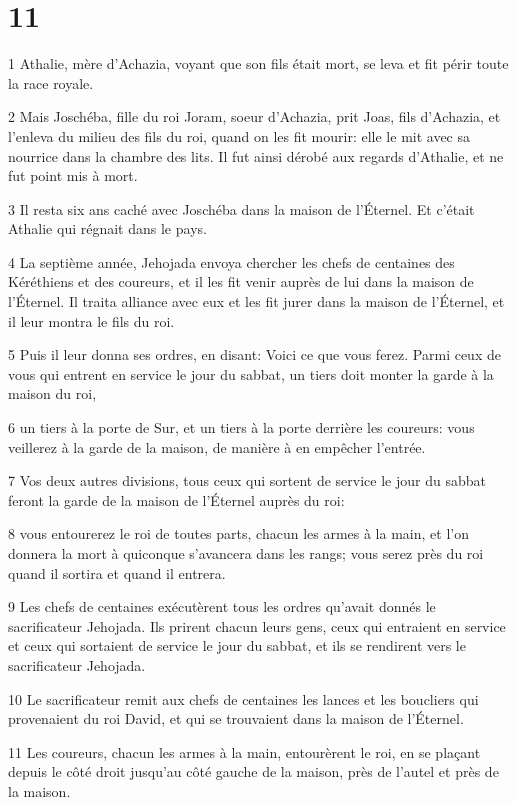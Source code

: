\chapter{11}

\par 1 Athalie, mère d'Achazia, voyant que son fils était mort, se leva et fit périr toute la race royale.
\par 2 Mais Joschéba, fille du roi Joram, soeur d'Achazia, prit Joas, fils d'Achazia, et l'enleva du milieu des fils du roi, quand on les fit mourir: elle le mit avec sa nourrice dans la chambre des lits. Il fut ainsi dérobé aux regards d'Athalie, et ne fut point mis à mort.
\par 3 Il resta six ans caché avec Joschéba dans la maison de l'Éternel. Et c'était Athalie qui régnait dans le pays.
\par 4 La septième année, Jehojada envoya chercher les chefs de centaines des Kéréthiens et des coureurs, et il les fit venir auprès de lui dans la maison de l'Éternel. Il traita alliance avec eux et les fit jurer dans la maison de l'Éternel, et il leur montra le fils du roi.
\par 5 Puis il leur donna ses ordres, en disant: Voici ce que vous ferez. Parmi ceux de vous qui entrent en service le jour du sabbat, un tiers doit monter la garde à la maison du roi,
\par 6 un tiers à la porte de Sur, et un tiers à la porte derrière les coureurs: vous veillerez à la garde de la maison, de manière à en empêcher l'entrée.
\par 7 Vos deux autres divisions, tous ceux qui sortent de service le jour du sabbat feront la garde de la maison de l'Éternel auprès du roi:
\par 8 vous entourerez le roi de toutes parts, chacun les armes à la main, et l'on donnera la mort à quiconque s'avancera dans les rangs; vous serez près du roi quand il sortira et quand il entrera.
\par 9 Les chefs de centaines exécutèrent tous les ordres qu'avait donnés le sacrificateur Jehojada. Ils prirent chacun leurs gens, ceux qui entraient en service et ceux qui sortaient de service le jour du sabbat, et ils se rendirent vers le sacrificateur Jehojada.
\par 10 Le sacrificateur remit aux chefs de centaines les lances et les boucliers qui provenaient du roi David, et qui se trouvaient dans la maison de l'Éternel.
\par 11 Les coureurs, chacun les armes à la main, entourèrent le roi, en se plaçant depuis le côté droit jusqu'au côté gauche de la maison, près de l'autel et près de la maison.
